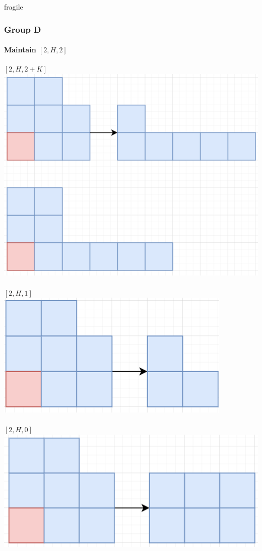 \documentclass[aspectratio=169,usenames,dvipsnames]{beamer}
\begin{document}
\begin{frame}{fragile}
    \frametitle{Group D}
    \framesubtitle{Maintain $[2, H, 2]$}
    
    \begin{multicols}{2}
    $[2, H, 2 + K]$\\
    \includegraphics[scale=.4]{[2, H, 2 + K].png}\\
    $  $\\
    $[2, H, 1]$\\
    \includegraphics[scale=.4]{[2, H, 1].png}\\
    $  $\\
    $[2, H, 0]$\\
    \includegraphics[scale=.4]{[2, H, 0].png}\\
    \end{multicols}
\end{frame}
\end{document}
